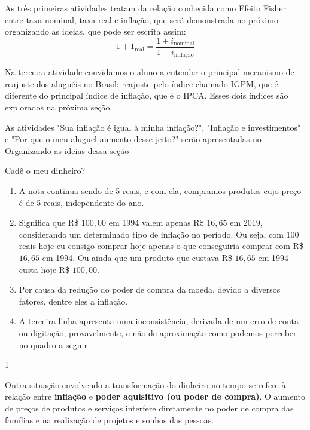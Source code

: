 \begin{texto}
{  As três primeiras atividades tratam da relação conhecida como Efeito Fisher entre taxa nominal, taxa real e inflação, que será demonstrada no próximo organizando as ideias, que pode ser escrita assim:
  \begin{equation*}
  1+1_{\text{real}}=\frac{1+i_{\text{nominal}}}{1+i_{\text{inflação}}}
  \end{equation*}

  Na terceira atividade convidamos o aluno a entender o principal mecanismo de reajuste dos aluguéis no Brasil: reajuste pelo índice chamado IGPM, que é diferente do principal índice de inflação, que é o IPCA. Esses dois índices são explorados na próxima seção. 

  As atividades "Sua inflação é igual à minha inflação?", "Inflação e investimentos"{} e "Por que o meu aluguel aumento desse jeito?"{} serão apresentadas no Organizando as ideias dessa seção

}
\end{texto}
\clearmargin
\marginpar{\vspace{.5em}}
\begin{answer}{Cadê o meu dinheiro?}
{
\begin{enumerate}
\item A nota continua sendo de 5 reais, e com ela, compramos produtos cujo preço é de 5 reais, independente do ano.
\item Significa que R\$ $100{,}00$ em 1994 valem apenas R\$ $16{,}65$ em 2019, considerando um determinado tipo de inflação no período. Ou seja, com 100 reais hoje eu consigo comprar hoje apenas o que conseguiria comprar com R\$ $16{,}65$ em 1994. Ou ainda que um produto que custava R\$ $16{,}65$ em 1994 custa hoje R\$ $100{,}00$. 
\item Por causa da redução do poder de compra da moeda, devido a diversos fatores, dentre eles a inflação.
\item A terceira linha apresenta uma inconsistência, derivada de um erro de conta ou digitação, provavelmente, e não de aproximação como podemos perceber no quadro a seguir
\end{enumerate}

}{1}
\end{answer}
\label{fin-exp-7}

Outra situação envolvendo a transformação do dinheiro no tempo se refere à relação entre \textbf{inflação} e \textbf{poder aquisitivo (ou poder de compra)}. O aumento de preços de produtos e serviços interfere diretamente no poder de compra das famílias e na realização de projetos e sonhos das pessoas.

